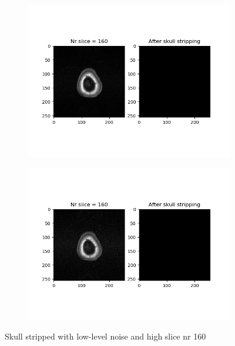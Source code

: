 \begin{figure}[H]
	\centering
	\begin{subfigure}[b]{0.35\linewidth}
		\includegraphics[scale=0.35]{figures/Module_08/M8_17.png}
	\end{subfigure}
		\begin{subfigure}[b]{0.35\linewidth}
		\includegraphics[scale=0.35]{figures/Module_08/M8_n17.png}
	\end{subfigure}
	\caption{Skull stripped with low-level noise and high slice nr 160}
	\label{fig:figures/m08_17}
\end{figure}

